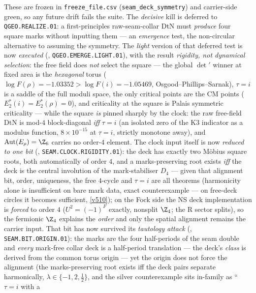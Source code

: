 These are frozen in \texttt{freeze\_file.csv} (\texttt{seam\_deck\_symmetry}) and carrier-side green, so any
future drift fails the suite. The \emph{decisive} kill is deferred to \texttt{QGEO.REALIZE.01}: a
first-principles raw-seam-collar DtN must \emph{produce} four square marks without inputting them --- an
\emph{emergence} test, the non-circular alternative to assuming the symmetry. The \emph{light} version of
that deferred test is now \emph{executed} (,
\texttt{QGEO.EMERGE.LIGHT.01}), with the result \emph{rigidity, not dynamical selection}: the free field
does \emph{not} select the square --- the global $\det{}'$ winner at fixed area is the \emph{hexagonal}
torus ($\log F(\rho)=-1.03352>\log F(i)=-1.05469$, Osgood--Phillips--Sarnak), $\tau=i$ is a saddle of the
full moduli space, the only critical points are the CM points ($E_2^*(i)=E_2^*(\rho)=0$), and criticality
at the square is Palais symmetric criticality --- while the square \emph{is} pinned sharply by the clock:
the raw free-field DtN is mod-$4$ block-diagonal \emph{iff} $\tau=i$ (an isolated zero of the K3
indicator as a modulus function, $8\times10^{-15}$ at $\tau=i$, strictly monotone away), and
$\mathrm{Aut}(E_\rho)=\Z_6$ carries no order-$4$ element. The clock input itself is now
\emph{reduced to one bit} (, \texttt{SEAM.CLOCK.RIGIDITY.01}):
the deck has exactly two M\"obius square roots, both automatically of order $4$, and a
marks-preserving root exists \emph{iff} the deck is the central involution of the mark-stabiliser
$D_4$ --- given that alignment bit, order, uniqueness, the free $4$-cycle and $\tau=i$ are all
theorems (harmonicity alone is insufficient on bare mark data, exact counterexample --- on free-deck
circles it becomes sufficient, \vref{v510}); on the Fock side the NS deck
implementation is \emph{forced} to order $4$ ($U^2=(-1)^F$ exactly, nonsplit $\Z_4$; the R sector
splits), so the fermionic $\Z_4$ explains the \emph{order} and only the spatial alignment remains
the carrier input. That bit has now survived its \emph{tautology attack}
(, \texttt{SEAM.BIT.ORIGIN.01}): the marks are the four
half-periods of the seam double and \emph{every} mark-free collar deck is a half-period translation
--- the deck's \emph{class} is derived from the common torus origin --- yet the origin does not
force the alignment (the marks-preserving root exists iff the deck pairs separate harmonically,
$\lambda\in\{-1,2,\tfrac12\}$, and the silver counterexample sits in-family as ``$\tau=i$ with a
